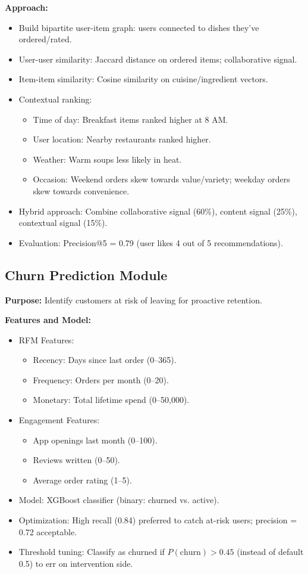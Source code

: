 \documentclass[12pt,a4paper]{report}
\begin{document}
\begin{itemize}
\textbf{Approach:}
\begin{itemize}
    \item Build bipartite user-item graph: users connected to dishes they've ordered/rated.
    \item User-user similarity: Jaccard distance on ordered items; collaborative signal.
    \item Item-item similarity: Cosine similarity on cuisine/ingredient vectors.
    \item Contextual ranking:
    \begin{itemize}
        \item Time of day: Breakfast items ranked higher at 8 AM.
        \item User location: Nearby restaurants ranked higher.
        \item Weather: Warm soups less likely in heat.
        \item Occasion: Weekend orders skew towards value/variety; weekday orders skew towards convenience.
    \end{itemize}
    \item Hybrid approach: Combine collaborative signal (60\%), content signal (25\%), contextual signal (15\%).
    \item Evaluation: Precision@5 = 0.79 (user likes 4 out of 5 recommendations).
\end{itemize}

\subsection{Churn Prediction Module}

\textbf{Purpose:} Identify customers at risk of leaving for proactive retention.

\textbf{Features and Model:}
\begin{itemize}
    \item RFM Features:
    \begin{itemize}
        \item Recency: Days since last order (0--365).
        \item Frequency: Orders per month (0--20).
        \item Monetary: Total lifetime spend (0--50,000).
    \end{itemize}
    \item Engagement Features:
    \begin{itemize}
        \item App openings last month (0--100).
        \item Reviews written (0--50).
        \item Average order rating (1--5).
    \end{itemize}
    \item Model: XGBoost classifier (binary: churned vs. active).
    \item Optimization: High recall (0.84) preferred to catch at-risk users; precision = 0.72 acceptable.
    \item Threshold tuning: Classify as churned if $P(\text{churn}) > 0.45$ (instead of default 0.5) to err on intervention side.
\end{itemize}


\end{itemize}
\end{document}
